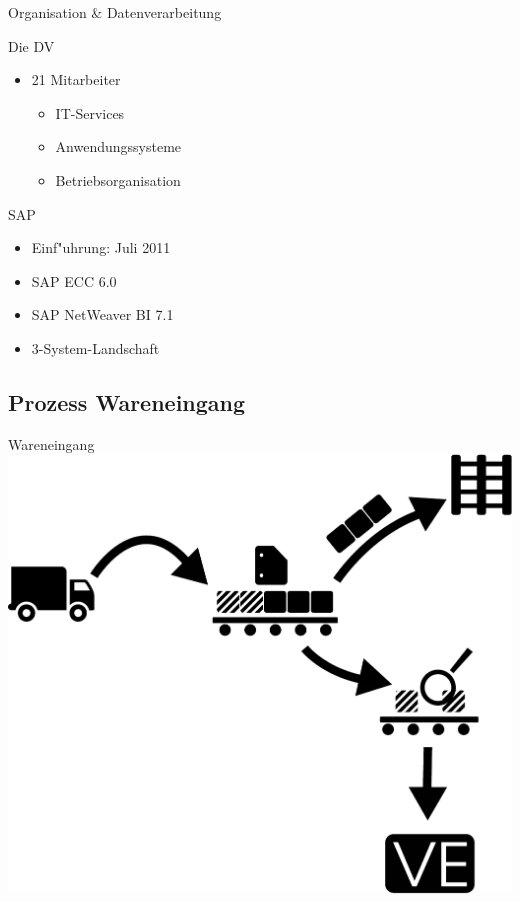 \begin{frame}[<+->]{Organisation \& Datenverarbeitung}
			\begin{block}{Die DV}
				\begin{itemize}
						\item 21 Mitarbeiter
						\begin{itemize}
							\item IT-Services
							\item \alert<6>{Anwendungssysteme}
							\item Betriebsorganisation
						\end{itemize}
				\end{itemize}
			\end{block}
			\pause
			\begin{block}{SAP}
				\begin{itemize}[<+->]
						\item Einf"uhrung: Juli 2011
						\item SAP ECC 6.0
						\item SAP NetWeaver BI 7.1
						\item 3-System-Landschaft
				\end{itemize}
			\end{block}
\end{frame}

\subsection{Prozess Wareneingang}
\begin{frame}{Wareneingang}
 \includegraphics[width=.9\textwidth]{Wareneingang}
\end{frame}

